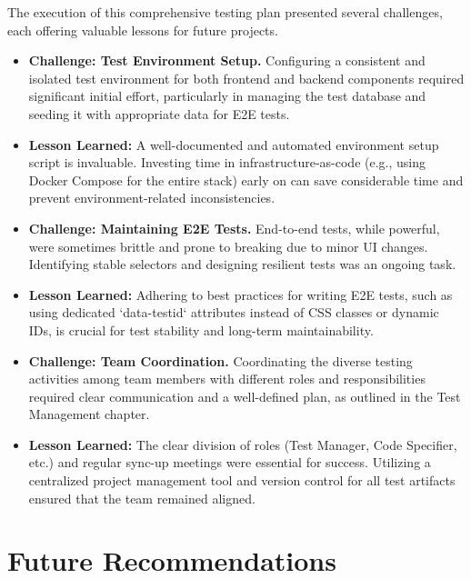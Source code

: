 The execution of this comprehensive testing plan presented several challenges, each offering valuable lessons for future projects.
\begin{itemize}
    \item \textbf{Challenge: Test Environment Setup.} Configuring a consistent and isolated test environment for both frontend and backend components required significant initial effort, particularly in managing the test database and seeding it with appropriate data for E2E tests.
    \item \textbf{Lesson Learned:} A well-documented and automated environment setup script is invaluable. Investing time in infrastructure-as-code (e.g., using Docker Compose for the entire stack) early on can save considerable time and prevent environment-related inconsistencies.

    \item \textbf{Challenge: Maintaining E2E Tests.} End-to-end tests, while powerful, were sometimes brittle and prone to breaking due to minor UI changes. Identifying stable selectors and designing resilient tests was an ongoing task.
    \item \textbf{Lesson Learned:} Adhering to best practices for writing E2E tests, such as using dedicated `data-testid` attributes instead of CSS classes or dynamic IDs, is crucial for test stability and long-term maintainability.

    \item \textbf{Challenge: Team Coordination.} Coordinating the diverse testing activities among team members with different roles and responsibilities required clear communication and a well-defined plan, as outlined in the Test Management chapter.
    \item \textbf{Lesson Learned:} The clear division of roles (Test Manager, Code Specifier, etc.) and regular sync-up meetings were essential for success. Utilizing a centralized project management tool and version control for all test artifacts ensured that the team remained aligned.
\end{itemize}

\section{Future Recommendations}
\label{sec:future_recommendations}

